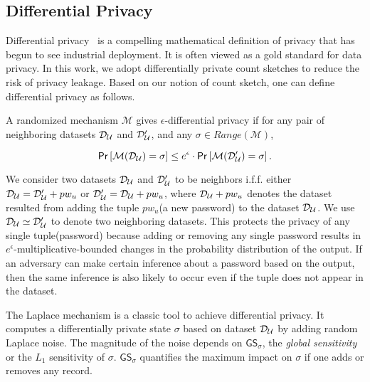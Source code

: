 \subsection{Differential Privacy} \label{section:Prelinmaries-DiffernetialPrivacy}



Differential privacy~\cite{ECS:Dwork11} is a compelling mathematical definition of privacy that has begun to see industrial deployment\cite{CCS:ErlPihKor14,AppleDP,AppleDPTeam}. It is often viewed as a gold standard for data privacy.  In this work, we adopt differentially private count sketches to reduce the risk of privacy leakage. Based on our notion of count sketch, one can define differential privacy as follows.

\begin{definition} \label{def:diff}
	
	A randomized mechanism $\mathcal{M}$ gives $\epsilon$-differential privacy if for any pair of neighboring datasets $\mathcal{D}_{{\mathcal{U}}}$ and $\mathcal{D}_{{\mathcal{U}}}'$, and any $\sigma \in \mathit{Range}(\mathcal{M})$,
	
	$$\mathsf{Pr} \left[\mathcal{M}(\mathcal{D}_{{\mathcal{U}}})=\sigma\right]  \leq e^{\epsilon}\cdot \mathsf{Pr} \left[\mathcal{M}(\mathcal{D}_{{\mathcal{U}}}')=\sigma\right] .$$
	
\end{definition}


We consider two datasets $\mathcal{D}_{{\mathcal{U}}}$ and $\mathcal{D}_{{\mathcal{U}}}'$ to be neighbors i.f.f. either $\mathcal{D}_{{\mathcal{U}}}=\mathcal{D}_{{\mathcal{U}}}' + pw_u$ or $\mathcal{D}_{{\mathcal{U}}}'=\mathcal{D}_{{\mathcal{U}}} + pw_u$, where $\mathcal{D}_{{\mathcal{U}}} +pw_u$ denotes the dataset resulted from adding the tuple $pw_u$(a new password) to the dataset $\mathcal{D}_{{\mathcal{U}}}$. We use $\mathcal{D}_{{\mathcal{U}}}\simeq \mathcal{D}_{{\mathcal{U}}}'$ to denote two neighboring datasets. This protects the privacy of any single tuple(password) because adding or removing any single password results in $e^{\epsilon}$-multiplicative-bounded changes in the probability distribution of the output. If an adversary can make certain inference about a password based on the output, then the same inference is also likely to occur even if the tuple does not appear in the dataset.


The Laplace mechanism is a classic tool to achieve differential privacy. It computes a differentially private state $\sigma$ based on dataset $\mathcal{D}_{{\mathcal{U}}}$ by adding random Laplace noise. The magnitude of the noise depends on $\mathsf{GS}_\sigma$, the \emph{global sensitivity} or the $L_1$ sensitivity of $\sigma$.  $\mathsf{GS}_\sigma$ quantifies the maximum impact on $\sigma$ if one adds or removes any record. 



